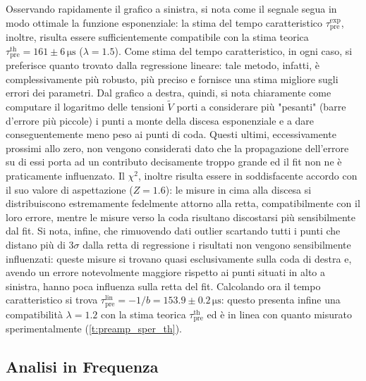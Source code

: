 \documentclass[a4paper,11pt]{article} %
\begin{document}
Osservando rapidamente il grafico a sinistra, si nota come il segnale segua in modo ottimale la funzione esponenziale:
la stima del tempo caratteristico $\tau_{\text{pre}}^{\text{exp}}$, inoltre, risulta essere sufficientemente compatibile
con la stima teorica $\tau_{\text{pre}}^{\text{th}} = 161 \pm 6 \,\si{\us}$ ($\lambda = 1.5$). Come stima del tempo
caratteristico, in ogni caso, si preferisce quanto trovato dalla regressione lineare: tale metodo, infatti, è
complessivamente più robusto, più preciso e fornisce una stima migliore sugli errori dei parametri. Dal grafico a
destra, quindi, si nota chiaramente come computare il logaritmo delle tensioni $\tilde{V}$ porti a considerare più
"pesanti" (barre d'errore più piccole) i punti a monte della discesa esponenziale e a dare conseguentemente meno peso ai
punti di coda. Questi ultimi, eccessivamente prossimi allo zero, non vengono considerati dato che la propagazione
dell'errore su di essi porta ad un contributo decisamente troppo grande ed il fit non ne è praticamente influenzato. Il
$\chi^2$, inoltre risulta essere in soddisfacente accordo con il suo valore di aspettazione ($Z = 1.6$): le misure in
cima alla discesa si distribuiscono estremamente fedelmente attorno alla retta, compatibilmente con il loro errore,
mentre le misure verso la coda risultano discostarsi più sensibilmente dal fit. Si nota, infine, che rimuovendo dati
outlier scartando tutti i punti che distano più di $3\sigma$ dalla retta di regressione i risultati non vengono
sensibilmente influenzati: queste misure si trovano quasi esclusivamente sulla coda di destra e, avendo un errore
notevolmente maggiore rispetto ai punti situati in alto a sinistra, hanno poca influenza sulla retta del fit. Calcolando
ora il tempo caratteristico si trova $\tau_{\text{pre}}^{\text{lin}}= -1/b = 153.9 \pm 0.2 \,\si{\us}$: questo presenta
infine una compatibilità $\lambda = 1.2$ con  la stima teorica $\tau_{\text{pre}}^{\text{th}}$ ed è in linea con quanto
misurato sperimentalmente (\autoref{t:preamp_sper_th}).



\subsection{Analisi in Frequenza}\label{s:preamp_bode}
\end{document}
